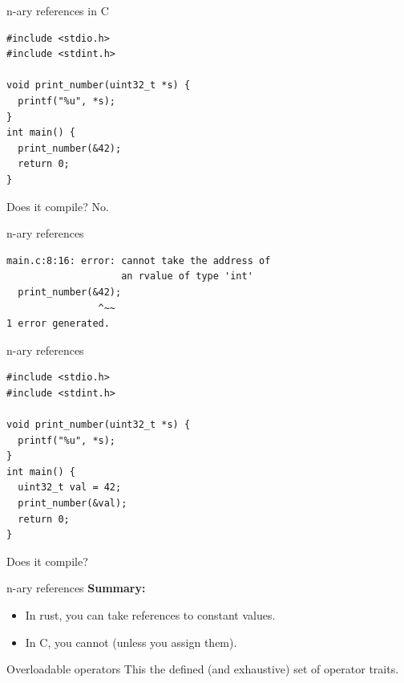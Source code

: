 \documentclass{beamer}
\begin{document}
\begin{frame}[fragile]{n-ary references in C}
  \begin{verbatim}
#include <stdio.h>
#include <stdint.h>

void print_number(uint32_t *s) {
  printf("%u", *s);
}
int main() {
  print_number(&42);
  return 0;
}
\end{verbatim}
Does it compile? No.
\end{frame}

\begin{frame}[fragile]{n-ary references}
  \begin{verbatim}
main.c:8:16: error: cannot take the address of
                    an rvalue of type 'int'
  print_number(&42);
                ^~~
1 error generated.
\end{verbatim}
\end{frame}

\begin{frame}[fragile]{n-ary references}
  \begin{verbatim}
#include <stdio.h>
#include <stdint.h>

void print_number(uint32_t *s) {
  printf("%u", *s);
}
int main() {
  uint32_t val = 42;
  print_number(&val);
  return 0;
}
\end{verbatim}
  Does it compile? 
\end{frame}

\begin{frame}[fragile]{n-ary references}
  \textbf{Summary:}
  \begin{itemize}
    \item In rust, you can take references to constant values.
    \item In C, you cannot (unless you assign them).
  \end{itemize}
\end{frame}

\begin{frame}[fragile]{Overloadable operators}
  This the defined (and exhaustive) set of operator traits.
\end{frame}
\end{document}
